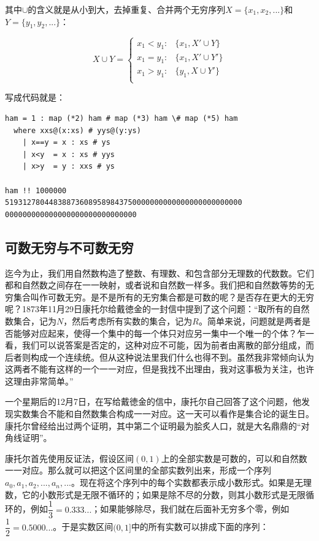 \documentclass{article}
\begin{document}
其中$\cup$的含义就是从小到大，去掉重复、合并两个无穷序列$X = \{x_1, x_2, ...\}$和$Y = \{y_1, y_2, ...\}$：

\[
X \cup Y =
\begin{cases}
x_1 < y_1 : & \{x_1, X' \cup Y \} \\
x_1 = y_1 : & \{x_1, X' \cup Y' \} \\
x_1 > y_1 : & \{y_1, X \cup Y' \} \\
\end{cases}
\]

写成代码就是：

\begin{lstlisting}
ham = 1 : map (*2) ham # map (*3) ham \# map (*5) ham
  where xxs@(x:xs) # yys@(y:ys)
    | x==y = x : xs # ys
    | x<y  = x : xs # yys
    | x>y  = y : xxs # ys

ham !! 1000000
519312780448388736089589843750000000000000000000000000
000000000000000000000000000000
\end{lstlisting}

\lstset{frame=none}

\subsection{可数无穷与不可数无穷}
迄今为止，我们用自然数构造了整数、有理数、和包含部分无理数的代数数。它们都和自然数之间存在一一映射，或者说和自然数一样多。我们把和自然数等势的无穷集合叫作可数无穷。是不是所有的无穷集合都是可数的呢？是否存在更大的无穷呢？1873年11月29日康托尔给戴徳金的一封信中提到了这个问题：“取所有的自然数集合，记为$N$，然后考虑所有实数的集合，记为$R$。简单来说，问题就是两者是否能够对应起来，使得一个集中的每一个体只对应另一集中一个唯一的个体？乍一看，我们可以说答案是否定的，这种对应不可能，因为前者由离散的部分组成，而后者则构成一个连续统。但从这种说法里我们什么也得不到。虽然我非常倾向认为这两者不能有这样的一个一一对应，但是我找不出理由，我对这事极为关注，也许这理由非常简单。”

一个星期后的12月7日，在写给戴徳金的信中，康托尔自己回答了这个问题，他发现实数集合不能和自然数集合构成一一对应。这一天可以看作是集合论的诞生日。康托尔曾经给出过两个证明，其中第二个证明最为脍炙人口，就是大名鼎鼎的“对角线证明”。

康托尔首先使用反证法，假设区间$(0, 1)$上的全部实数是可数的，可以和自然数一一对应。那么就可以把这个区间里的全部实数列出来，形成一个序列$a_0, a_1, a_2, ..., a_n, ...$。现在将这个序列中的每个实数都表示成小数形式。如果是无理数，它的小数形式是无限不循环的；如果是除不尽的分数，则其小数形式是无限循环的，例如$\dfrac{1}{3} = 0.333...$；如果能够除尽，我们就在后面补无穷多个零，例如$\dfrac{1}{2} = 0.5000...$。于是实数区间$(0, 1]$中的所有实数可以排成下面的序列：
\end{document}
